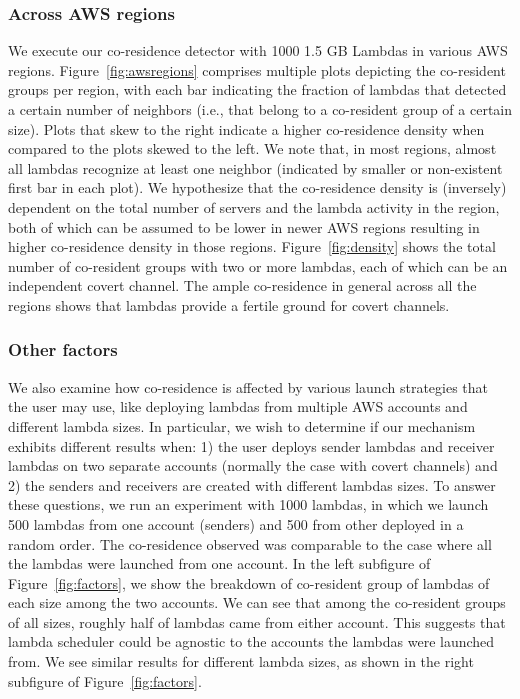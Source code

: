 \subsubsection{Across AWS regions}  
We execute our co-residence detector with 1000 1.5 GB Lambdas in various AWS
regions. Figure~\ref{fig:awsregions} comprises multiple plots depicting the
co-resident groups per region, with each bar indicating the fraction of lambdas
that detected a certain number of neighbors (i.e., that belong to a co-resident
group of a certain size). Plots that skew to the right indicate a higher
co-residence density when compared to the plots skewed to the left.  We note
that, in most regions, almost all lambdas recognize at least one neighbor
(indicated by smaller or non-existent first bar in each plot). We hypothesize
that the co-residence density is (inversely) dependent on the total number of
servers and the lambda activity in the region, both of which can be assumed to
be lower in newer AWS regions resulting in higher co-residence density in those
regions. Figure~\ref{fig:density} shows the total number of co-resident groups
with two or more lambdas, each of which can be an independent covert channel.
The ample co-residence in general across all the regions shows that lambdas
provide a fertile ground for covert channels.


\subsubsection{Other factors}
We also examine how co-residence is affected by various launch strategies that
the user may use, like deploying lambdas from multiple AWS accounts and
different lambda sizes. In particular, we wish to determine if our mechanism
exhibits different results when: 1) the user deploys sender lambdas and receiver
lambdas on two separate accounts (normally the case with covert channels) and 2)
the senders and receivers are created with different lambdas sizes.  To answer
these questions, we run an experiment with 1000 lambdas, in which we launch 500
lambdas from one account (senders) and 500 from other deployed in a random
order. The co-residence observed was comparable to the case where all the
lambdas were launched from one account. In the left subfigure of
Figure~\ref{fig:factors}, we show the breakdown of co-resident group of lambdas
of each size among the two accounts.  We can see that among the co-resident
groups of all sizes, roughly half of lambdas came from either account. This suggests 
that lambda scheduler could be agnostic to the accounts the lambdas were launched
from. We see similar results for different lambda sizes, as shown in the right
subfigure of Figure~\ref{fig:factors}.

